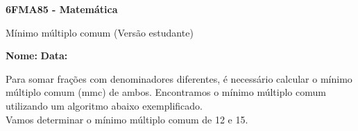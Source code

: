 \documentclass[a4paper,14pt]{article}
\begin{document}
	
	\noindent\textbf{6FMA85 - Matemática} 
	
	\begin{center}Mínimo múltiplo comum (Versão estudante)
	\end{center}
	
	\noindent\textbf{Nome:} \underline{\hspace{10cm}}
	\noindent\textbf{Data:} \underline{\hspace{4cm}}
	
	
	\begin{multicols}{2}
		\noindent Para somar frações com denominadores diferentes, é necessário calcular o mínimo múltiplo comum (mmc) de ambos. Encontramos o mínimo múltiplo comum utilizando um algoritmo abaixo exemplificado. \\
		Vamos determinar o mínimo múltiplo comum de 12 e 15. \\
			

\end{multicols}
\end{document}
